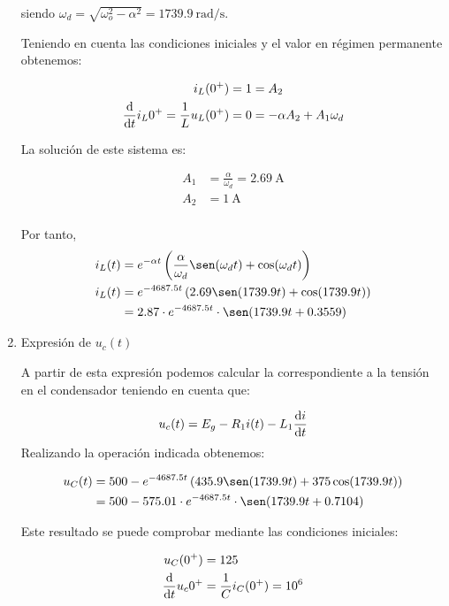 \begin{enumerate}
  siendo $\omega_d = \sqrt{\omega_o^2 - \alpha^2} = \SI{1739.9}{\radian\per\second}$.
  
  Teniendo en cuenta las condiciones iniciales y el valor en régimen permanente obtenemos:

  \begin{align*}
    i_L(0^+) = 1 &= A_2\\
    \diff*{i_L}{t}{0^+} = \frac{1}{L}u_L(0^+) = 0 &= -\alpha A_2 + A_1 \omega_d
  \end{align*}

  La solución de este sistema es:

  \begin{align*}
    A_1 &= \frac{\alpha}{\omega_d} = \qty{2.69}\ampere\\
    A_2 &= \qty{1}{\ampere}\\
  \end{align*}
  
  Por tanto,
  \begin{align*}
        i_L(t) &= e^{-\alpha t} \left(\frac{\alpha}{\omega_d} \sen(\omega_d t) + \cos(\omega_d t)\right)\\
    i_L(t) &= e^{-4687.5 t} \left(2.69 \sen(1739.9t) + \cos(1739.9 t)\right)\\
               &= 2.87 \cdot e^{-4687.5 t} \cdot \sen(1739.9t + 0.3559)
  \end{align*}

\item Expresión de $u_c(t)$

  A partir de esta expresión podemos calcular la correspondiente a la tensión en el condensador teniendo en cuenta que:

  \[
    u_c(t) = E_g - R_1 i(t) - L_1 \diff{i}{t}
  \]
  Realizando la operación indicada obtenemos:

  \begin{align*}
    u_C(t) &= 500 - e^{-4687.5 t} \left(435.9 \sen(1739.9t) + 375 \cos(1739.9 t)\right)\\
           &= 500 - 575.01 \cdot e^{-4687.5 t} \cdot  \sen(1739.9t + 0.7104)
  \end{align*}

  Este resultado se puede comprobar mediante las condiciones iniciales:

    \begin{align*}
    u_C(0^+) &= 125\\
    \diff*{u_c}{t}{0^+} &= \frac{1}{C}i_C(0^+) = 10^6\\
  \end{align*}

\end{enumerate}



